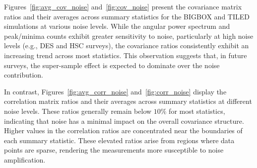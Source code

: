 Figures~\ref{fig:avg_cov_noise} and~\ref{fig:cov_noise} present the covariance matrix ratios and their averages across summary statistics for the BIGBOX and TILED simulations at various noise levels. While the angular power spectrum and peak/minima counts exhibit greater sensitivity to noise, particularly at high noise levels (e.g., DES and HSC surveys), the covariance ratios consistently exhibit an increasing trend across most statistics. This observation suggests that, in future surveys, the super-sample effect is expected to dominate over the noise contribution.

In contrast, Figures~\ref{fig:avg_corr_noise} and~\ref{fig:corr_noise} display the correlation matrix ratios and their averages across summary statistics at different noise levels. These ratios generally remain below $10\%$ for most statistics, indicating that noise has a minimal impact on the overall covariance structure. Higher values in the correlation ratios are concentrated near the boundaries of each summary statistic. These elevated ratios arise from regions where data points are sparse, rendering the measurements more susceptible to noise amplification.

